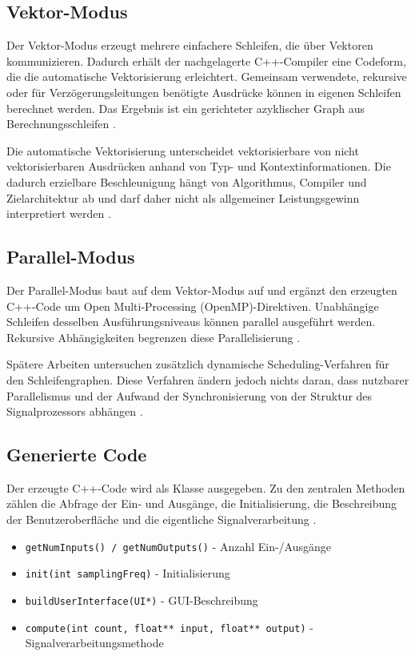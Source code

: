 \subsection{Vektor-Modus}
Der Vektor-Modus erzeugt mehrere einfachere Schleifen, die über Vektoren kommunizieren. Dadurch erhält der nachgelagerte C++-Compiler eine Codeform, die die automatische Vektorisierung erleichtert. Gemeinsam verwendete, rekursive oder für Verzögerungsleitungen benötigte Ausdrücke können in eigenen Schleifen berechnet werden. Das Ergebnis ist ein gerichteter azyklischer Graph aus Berechnungsschleifen \parencite[S.~15--17]{orlarey:hal-02159014}.

Die automatische Vektorisierung unterscheidet vektorisierbare von nicht vektorisierbaren Ausdrücken anhand von Typ- und Kontextinformationen. Die dadurch erzielbare Beschleunigung hängt von Algorithmus, Compiler und Zielarchitektur ab und darf daher nicht als allgemeiner Leistungsgewinn interpretiert werden \parencite{scaringella:hal-02158949}.

\subsection{Parallel-Modus}

Der Parallel-Modus baut auf dem Vektor-Modus auf und ergänzt den erzeugten C++-Code um Open Multi-Processing (OpenMP)-Direktiven. Unabhängige Schleifen desselben Ausführungsniveaus können parallel ausgeführt werden. Rekursive Abhängigkeiten begrenzen diese Parallelisierung \parencite[S.~17--21]{orlarey:hal-02159014}.

Spätere Arbeiten untersuchen zusätzlich dynamische Scheduling-Verfahren für den Schleifengraphen. Diese Verfahren ändern jedoch nichts daran, dass nutzbarer Parallelismus und der Aufwand der Synchronisierung von der Struktur des Signalprozessors abhängen \parencite{letz:hal-02158924}.
\subsection{Generierte Code}

Der erzeugte C++-Code wird als Klasse ausgegeben. Zu den zentralen Methoden zählen die Abfrage der Ein- und Ausgänge, die Initialisierung, die Beschreibung der Benutzeroberfläche und die eigentliche Signalverarbeitung \parencite[S.~6--7]{orlarey:hal-02159014}.

\begin{itemize}
	\item \texttt{getNumInputs() / getNumOutputs()} - Anzahl Ein-/Ausgänge
	\item \texttt{init(int samplingFreq)} - Initialisierung
	\item \texttt{buildUserInterface(UI*)} - GUI-Beschreibung
	\item \texttt{compute(int count, float** input, float** output)} - Signalverarbeitungsmethode
\end{itemize}

